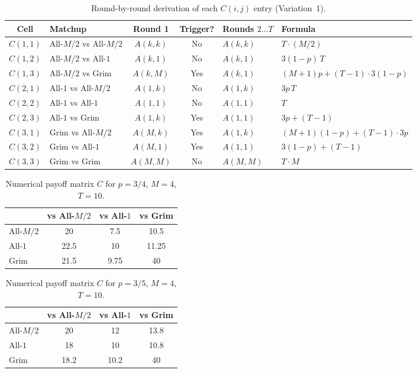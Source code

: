 \documentclass[12pt,a4paper]{article}
\begin{document}
\begin{table}[H]
\centering
\caption{Round-by-round derivation of each $C(i,j)$ entry (Variation~1).}
\label{tab:v1_C_derivation}
\small
\begin{tabular}{clccll}
\toprule
Cell & Matchup & Round 1 & Trigger? & Rounds $2\ldots T$ & Formula \\
\midrule
$C(1,1)$ & All-$M/2$ vs All-$M/2$ & $A(k,k)$ & No  & $A(k,k)$   & $T\cdot(M/2)$ \\
$C(1,2)$ & All-$M/2$ vs All-$1$   & $A(k,1)$ & No  & $A(k,1)$   & $3(1-p)\,T$ \\
$C(1,3)$ & All-$M/2$ vs Grim      & $A(k,M)$ & Yes & $A(k,1)$   & $(M+1)p+(T-1)\cdot3(1-p)$ \\
$C(2,1)$ & All-$1$ vs All-$M/2$   & $A(1,k)$ & No  & $A(1,k)$   & $3p\,T$ \\
$C(2,2)$ & All-$1$ vs All-$1$     & $A(1,1)$ & No  & $A(1,1)$   & $T$ \\
$C(2,3)$ & All-$1$ vs Grim        & $A(1,k)$ & Yes & $A(1,1)$   & $3p+(T-1)$ \\
$C(3,1)$ & Grim vs All-$M/2$      & $A(M,k)$ & Yes & $A(1,k)$   & $(M+1)(1-p)+(T-1)\cdot3p$ \\
$C(3,2)$ & Grim vs All-$1$        & $A(M,1)$ & Yes & $A(1,1)$   & $3(1-p)+(T-1)$ \\
$C(3,3)$ & Grim vs Grim           & $A(M,M)$ & No  & $A(M,M)$   & $T\cdot M$ \\
\bottomrule
\end{tabular}
\end{table}

\begin{table}[H]
\centering
\caption{Numerical payoff matrix $C$ for $p=3/4$, $M=4$, $T=10$.}
\label{tab:v1_C_p075}
\begin{tabular}{lccc}
\toprule
           & vs All-$M/2$ & vs All-$1$ & vs Grim \\
\midrule
All-$M/2$  & 20    & 7.5   & 10.5   \\
All-$1$    & 22.5  & 10    & 11.25  \\
Grim       & 21.5  & 9.75  & 40     \\
\bottomrule
\end{tabular}
\end{table}

\begin{table}[H]
\centering
\caption{Numerical payoff matrix $C$ for $p=3/5$, $M=4$, $T=10$.}
\label{tab:v1_C_p060}
\begin{tabular}{lccc}
\toprule
           & vs All-$M/2$ & vs All-$1$ & vs Grim \\
\midrule
All-$M/2$  & 20    & 12    & 13.8   \\
All-$1$    & 18    & 10    & 10.8   \\
Grim       & 18.2  & 10.2  & 40     \\
\bottomrule
\end{tabular}
\end{table}
\end{document}

